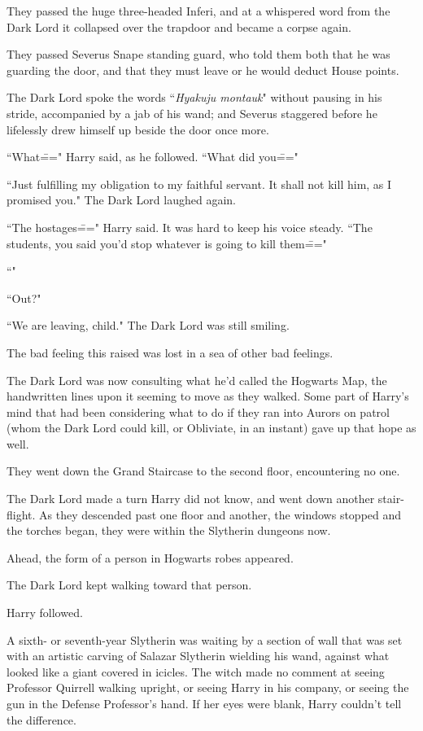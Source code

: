 They passed the huge three-headed Inferi, and at a whispered word from the Dark Lord it collapsed over the trapdoor and became a corpse again.

They passed Severus Snape standing guard, who told them both that he was guarding the door, and that they must leave or he would deduct House points.

The Dark Lord spoke the words ``\emph{Hyakuju montauk}" without pausing in his stride, accompanied by a jab of his wand; and Severus staggered before he lifelessly drew himself up beside the door once more.

``What\===" Harry said, as he followed. ``What did you\==="

``Just fulfilling my obligation to my faithful servant. It shall not kill him, as I promised you." The Dark Lord laughed again.

``The hostages\===" Harry said. It was hard to keep his voice steady. ``The students, you said you'd stop whatever is going to kill them\==="

``"

``Out?"

``We are leaving, child." The Dark Lord was still smiling.

The bad feeling this raised was lost in a sea of other bad feelings.

The Dark Lord was now consulting what he'd called the Hogwarts Map, the handwritten lines upon it seeming to move as they walked. Some part of Harry's mind that had been considering what to do if they ran into Aurors on patrol (whom the Dark Lord could kill, or Obliviate, in an instant) gave up that hope as well.

They went down the Grand Staircase to the second floor, encountering no one.

The Dark Lord made a turn Harry did not know, and went down another stair-flight. As they descended past one floor and another, the windows stopped and the torches began, they were within the Slytherin dungeons now.

Ahead, the form of a person in Hogwarts robes appeared.

The Dark Lord kept walking toward that person.

Harry followed.

A sixth- or seventh-year Slytherin was waiting by a section of wall that was set with an artistic carving of Salazar Slytherin wielding his wand, against what looked like a giant covered in icicles. The witch made no comment at seeing Professor Quirrell walking upright, or seeing Harry in his company, or seeing the gun in the Defense Professor's hand. If her eyes were blank, Harry couldn't tell the difference.

